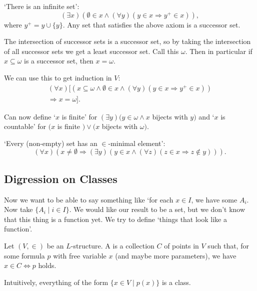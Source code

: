 \documentclass[a4paper, 10pt, twocolumn]{amsart}
\begin{document}
\begin{axiom}
`There is an infinite set':
$$
(\exists x)(\emptyset \in x \land (\forall y)(y \in x \Rightarrow y^+ \in x)),
$$
where $y^+ = y \cup \{y\}$. Any set that satisfies the above axiom is a successor set.
\end{axiom}

The intersection of successor sets is a successor set, so by taking the intersection of all successor sets we get a least successor set. Call this $\omega$. Then in particular if $x \subseteq \omega$ is a successor set, then $x = \omega$.

We can use this to get induction in $V$:
\begin{align*}
(\forall x)[(x \subseteq \omega \land \emptyset \in x\land
 (\forall y)(y \in x \Rightarrow y^+ \in x))\\
 \Rightarrow x= \omega].
\end{align*}


Can now define `$x$ is finite' for $(\exists y)(y \in \omega \land x$ bijects with $y)$ and `$x$ is countable' for $(x$ is finite $) \lor(x$ bijects with $\omega)$.

\begin{axiom}
  `Every (non-empty) set has an $\in$-minimal element':
  $$
  (\forall x)(x \neq \emptyset \Rightarrow(\exists y)(y \in x \land(\forall z)(z \in x \Rightarrow z \notin y))) .
  $$
\end{axiom}

\subsection{Digression on Classes}

Now we want to be able to say something like `for each $x \in I$, we have some $A_i$. Now take $\{A_i \mid i \in I\}$. We would like our result to be a set, but we don't know that this thing is a function yet. We try to define `things that look like a function'.

\begin{definition}[Class]
  Let $(V, \in)$ be an $L$-structure. A  is a collection $C$ of points in $V$ such that, for some formula $p$ with free variable $x$ (and maybe more parameters), we have $x \in C \Leftrightarrow p$ holds. 
\end{definition}
Intuitively, everything of the form $\{x \in V \mid p(x)\}$ is a class.
\end{document}
